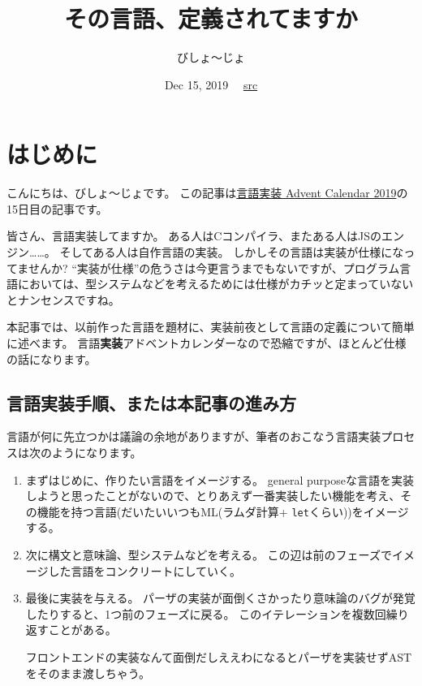 \documentclass{ltjsarticle}
\author{びしょ〜じょ}
\title{その言語、定義されてますか}
\date{Dec 15, 2019 \ \  {\small \href{https://github.com/Nymphium/nymphium.github.io/blob/source/src/2019/12/15/%E3%80%8E%E3%81%9D%E3%81%AE%E8%A8%80%E8%AA%9E%EF%BD%A4%E5%AE%9A%E7%BE%A9%E3%81%95%E3%82%8C%E3%81%A6%E3%81%BE%E3%81%99%E3%81%8B%E3%80%8F/main.tex}{src}}}
\begin{document}
\maketitle

\section{はじめに}
こんにちは、びしょ〜じょです。
この記事は\href{https://qiita.com/advent-calendar/2019/lang_dev}{言語実装 Advent Calendar 2019}の15日目の記事です。

皆さん、言語実装してますか。
ある人はCコンパイラ、またある人はJSのエンジン……。
そしてある人は自作言語の実装。
しかしその言語は実装が仕様になってませんか?
``実装が仕様''の危うさは今更言うまでもないですが、プログラム言語においては、型システムなどを考えるためには仕様がカチッと定まっていないとナンセンスですね。

本記事では、以前作った言語\href{https://github.com/nymphium/lambdaeff}{\lambdaeff}を題材に、実装前夜として言語の定義について簡単に述べます。
言語\textbf{実装}アドベントカレンダーなので恐縮ですが、ほとんど仕様の話になります。

\subsection{言語実装手順、または本記事の進み方}
言語が何に先立つかは議論の余地がありますが、筆者のおこなう言語実装プロセスは次のようになります。

\begin{enumerate}
  \item\label{enum:proc1}
    まずはじめに、作りたい言語をイメージする。
    general purposeな言語を実装しようと思ったことがないので、とりあえず一番実装したい機能を考え、その機能を持つ言語(だいたいいつもML(ラムダ計算+ \lstinline{let}くらい))をイメージする。

  \item\label{enum:proc2}
    次に構文と意味論、型システムなどを考える。
    この辺は前のフェーズでイメージした言語をコンクリートにしていく。

  \item\label{enum:proc3}
    最後に実装を与える。
    パーザの実装が面倒くさかったり意味論のバグが発覚したりすると、1つ前のフェーズに戻る。
    このイテレーションを複数回繰り返すことがある。

    フロントエンドの実装なんて面倒だしええわになるとパーザを実装せずASTをそのまま渡しちゃう。
\end{enumerate}
\end{document}
